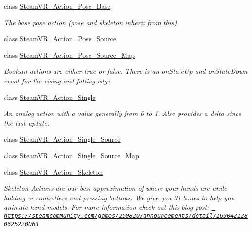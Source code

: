\begin{DoxyCompactItemize}
class \mbox{\hyperlink{class_valve_1_1_v_r_1_1_steam_v_r___action___pose___base}{Steam\+V\+R\+\_\+\+Action\+\_\+\+Pose\+\_\+\+Base}}
\begin{DoxyCompactList}\small\item\em The base pose action (pose and skeleton inherit from this) \end{DoxyCompactList}\item 
class \mbox{\hyperlink{class_valve_1_1_v_r_1_1_steam_v_r___action___pose___source}{Steam\+V\+R\+\_\+\+Action\+\_\+\+Pose\+\_\+\+Source}}
\item 
class \mbox{\hyperlink{class_valve_1_1_v_r_1_1_steam_v_r___action___pose___source___map}{Steam\+V\+R\+\_\+\+Action\+\_\+\+Pose\+\_\+\+Source\+\_\+\+Map}}
\begin{DoxyCompactList}\small\item\em Boolean actions are either true or false. There is an on\+State\+Up and on\+State\+Down event for the rising and falling edge. \end{DoxyCompactList}\item 
class \mbox{\hyperlink{class_valve_1_1_v_r_1_1_steam_v_r___action___single}{Steam\+V\+R\+\_\+\+Action\+\_\+\+Single}}
\begin{DoxyCompactList}\small\item\em An analog action with a value generally from 0 to 1. Also provides a delta since the last update. \end{DoxyCompactList}\item 
class \mbox{\hyperlink{class_valve_1_1_v_r_1_1_steam_v_r___action___single___source}{Steam\+V\+R\+\_\+\+Action\+\_\+\+Single\+\_\+\+Source}}
\item 
class \mbox{\hyperlink{class_valve_1_1_v_r_1_1_steam_v_r___action___single___source___map}{Steam\+V\+R\+\_\+\+Action\+\_\+\+Single\+\_\+\+Source\+\_\+\+Map}}
\item 
class \mbox{\hyperlink{class_valve_1_1_v_r_1_1_steam_v_r___action___skeleton}{Steam\+V\+R\+\_\+\+Action\+\_\+\+Skeleton}}
\begin{DoxyCompactList}\small\item\em Skeleton Actions are our best approximation of where your hands are while holding vr controllers and pressing buttons. We give you 31 bones to help you animate hand models. For more information check out this blog post\+: \href{https://steamcommunity.com/games/250820/announcements/detail/1690421280625220068}{\texttt{ https\+://steamcommunity.\+com/games/250820/announcements/detail/1690421280625220068}} \end{DoxyCompactList}\item 

\end{DoxyCompactItemize}
